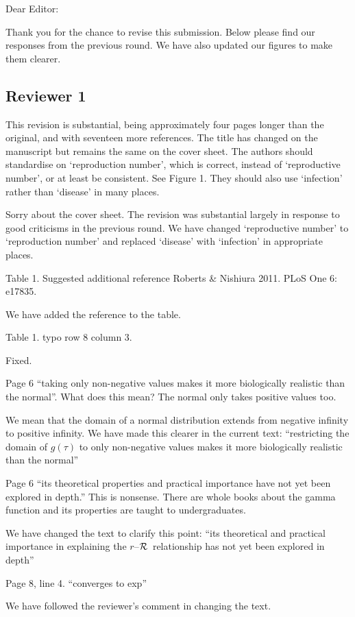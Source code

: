 \documentclass[12pt]{article}
\newcommand{\rR}{\mbox{$r$--$\cal R$}}
\newcommand{\rev}{\subsection*}
\newcommand{\revtext}{\textsf}
\begin{document}
\noindent Dear Editor:

Thank you for the chance to revise this submission. 
Below please find our responses from the previous round.
We have also updated our figures to make them clearer.

\rev{Reviewer 1}

\revtext{This revision is substantial, being approximately four pages longer than the
original, and with seventeen more references. The title has changed on the
manuscript but remains the same on the cover sheet. The authors should
standardise on ‘reproduction number’, which is correct, instead of ‘reproductive
number’, or at least be consistent. See Figure 1. They should also use ‘infection’
rather than ‘disease’ in many places.}

Sorry about the cover sheet. The revision was substantial largely in response to good criticisms in the previous round.
We have changed `reproductive number' to `reproduction number' and replaced `disease' with `infection' in appropriate places.

\revtext{Table 1. Suggested additional reference Roberts \& Nishiura 2011. PLoS One 6: e17835.}

We have added the reference to the table.

\revtext{Table 1. typo row 8 column 3.}

Fixed.

\revtext{Page 6 “taking only non-negative values makes it more biologically realistic than the normal”. What does this mean? The normal only takes positive values too.}

We mean that the domain of a normal distribution extends from negative infinity to positive infinity.
We have made this clearer in the current text: ``restricting the domain of $g(\tau)$ to only non-negative values makes it more biologically realistic than the normal''

\revtext{Page 6 “its theoretical properties and practical importance have not yet been explored in depth.” This is nonsense. There are whole books about the gamma function and its properties are taught to undergraduates.}

We have changed the text to clarify this point: ``its theoretical and practical importance in explaining the \rR\ relationship has not yet been explored in depth''

\revtext{Page 8, line 4. “converges to exp”}

We have followed the reviewer's comment in changing the text.
\end{document}
